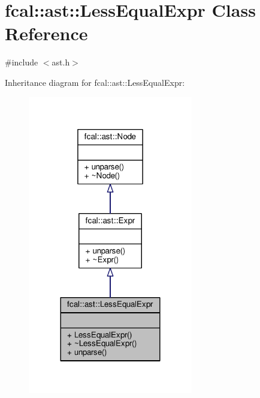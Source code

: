 \hypertarget{classfcal_1_1ast_1_1LessEqualExpr}{}\section{fcal\+:\+:ast\+:\+:Less\+Equal\+Expr Class Reference}
\label{classfcal_1_1ast_1_1LessEqualExpr}


{\ttfamily \#include $<$ast.\+h$>$}



Inheritance diagram for fcal\+:\+:ast\+:\+:Less\+Equal\+Expr\+:
\nopagebreak
\begin{figure}[H]
\begin{center}
\leavevmode
\includegraphics[width=204pt]{classfcal_1_1ast_1_1LessEqualExpr__inherit__graph}
\end{center}
\end{figure}


